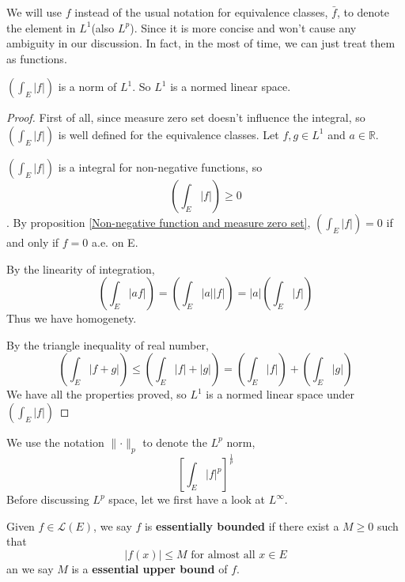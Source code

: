 \documentclass[lang=en, 12pt]{elegantbook}
\newcommand{\RR}{\mathbb{R}}
\begin{document}
        We will use $f$ instead of the usual notation for 
    equivalence classes, $\bar{f}$, to denote the element in 
    $L^1$(also $L^p$). Since it is more concise and 
    won't cause any ambiguity in our discussion. In fact, 
    in the most of time, we can just treat them as functions.
        \begin{proposition}
            $\left(\int_E |f|\right)$ is a norm of $L^1$.
        So $L^1$ is a normed linear space.
        \end{proposition}
        \begin{proof}
            First of all, since measure zero set doesn't influence 
        the integral, so $\left(\int_E |f|\right)$ is well defined 
        for the equivalence classes. Let $f, g \in L^1$ and $a \in \RR$.\par
            $\left(\int_E |f|\right)$
        is a integral for non-negative functions, so 
        $$\left(\int_E |f|\right) \geq 0$$.
        By proposition \ref{Non-negative function and measure zero set}, 
        $\left(\int_E |f|\right) = 0$ if and only if $f = 0$ a.e. on E.\par
            By the linearity of integration,  
            $$\left(\int_E |af|\right) = \left(\int_E |a||f|\right) = |a|\left(\int_E |f|\right)$$
            Thus we have homogenety.\par
            By the triangle inequality of real number,
            $$\left(\int_E |f+g|\right) \leq 
            \left(\int_E |f|+|g|\right) = \left(\int_E |f|\right)
            +\left(\int_E |g|\right)$$
            We have all the properties proved, so $L^1$ is a normed 
        linear space under $\left(\int_E |f|\right)$
        \end{proof}
        We use the notation $\lVert \cdot\rVert_p$ to denote the $L^p$ norm,
        $$\left[\int_E |f|^p\right]^{\frac{1}{p}}$$
    Before discussing $L^p$ space, let we first have a look at $L^{\infty}$.
        \begin{definition}
            Given $f \in \mathcal{L}(E)$, we say $f$ is \textbf{essentially bounded}
        if there exist a $M\geq 0$ such that 
        $$ |f(x)| \leq M \mbox{ for almost all } x\in E$$
        an we say $M$ is a \textbf{essential upper bound} of $f$.
        \end{definition}
\end{document}
